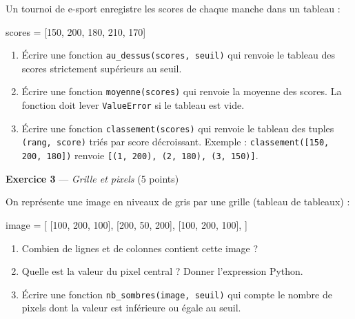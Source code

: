 Un tournoi de e-sport enregistre les scores de chaque manche dans un tableau :

\begin{python}
scores = [150, 200, 180, 210, 170]
\end{python}

\begin{enumerate}
  \item Écrire une fonction \lstinline{au_dessus(scores, seuil)} qui renvoie le tableau
        des scores strictement supérieurs au seuil.
  \item Écrire une fonction \lstinline{moyenne(scores)} qui renvoie la moyenne des scores.
        La fonction doit lever \lstinline{ValueError} si le tableau est vide.
  \item Écrire une fonction \lstinline{classement(scores)} qui renvoie le tableau des
        tuples \lstinline{(rang, score)} triés par score décroissant.
        Exemple : \lstinline{classement([150, 200, 180])} renvoie
        \lstinline{[(1, 200), (2, 180), (3, 150)]}.
\end{enumerate}


\bigskip

\textbf{Exercice 3} --- \textit{Grille et pixels} \hfill (5 points)

On représente une image en niveaux de gris par une grille (tableau de tableaux) :
\begin{python}
image = [
    [100, 200, 100],
    [200, 50,  200],
    [100, 200, 100],
]
\end{python}

\begin{enumerate}
  \item Combien de lignes et de colonnes contient cette image ?
  \item Quelle est la valeur du pixel central ? Donner l'expression Python.
  \item Écrire une fonction \lstinline{nb_sombres(image, seuil)} qui compte le nombre
        de pixels dont la valeur est inférieure ou égale au seuil.
\end{enumerate}


